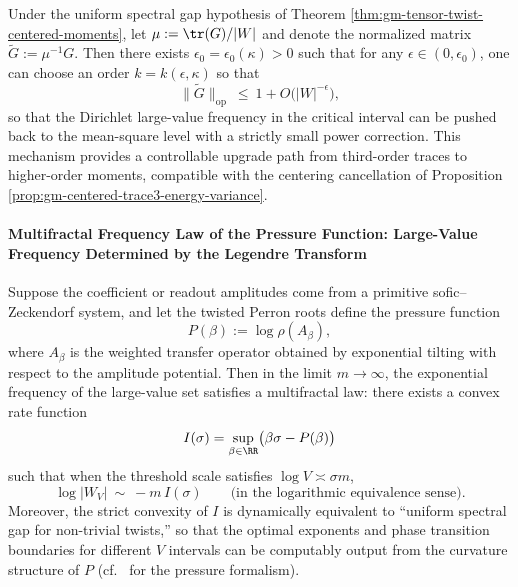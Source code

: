 \begin{corollary}\label{cor:gm-adjustable-moment-mean-square}
Under the uniform spectral gap hypothesis of Theorem \ref{thm:gm-tensor-twist-centered-moments}, let \(\mu:=\tr(G)/|W|\) and denote the normalized matrix \(\widetilde G:=\mu^{-1}G\).
Then there exists \(\epsilon_0=\epsilon_0(\kappa)>0\) such that for any \(\epsilon\in(0,\epsilon_0)\), one can choose an order \(k=k(\epsilon,\kappa)\) so that
\[
\|\widetilde G\|_{\mathrm{op}}
\ \le\
1+O\!\bigl(|W|^{-\epsilon}\bigr),
\]
so that the Dirichlet large-value frequency in the critical interval can be pushed back to the mean-square level with a strictly small power correction.
This mechanism provides a controllable upgrade path from third-order traces to higher-order moments, compatible with the centering cancellation of Proposition \ref{prop:gm-centered-trace3-energy-variance}.
\end{corollary}

\paragraph{Multifractal Frequency Law of the Pressure Function: Large-Value Frequency Determined by the Legendre Transform}
\begin{theorem}\label{thm:gm-multifractal-pressure-legendre}
Suppose the coefficient or readout amplitudes come from a primitive sofic--Zeckendorf system, and let the twisted Perron roots define the pressure function
\[
P(\beta):=\log\rho(A_\beta),
\]
where \(A_\beta\) is the weighted transfer operator obtained by exponential tilting with respect to the amplitude potential.
Then in the limit \(m\to\infty\), the exponential frequency of the large-value set satisfies a multifractal law: there exists a convex rate function
\[
I(\sigma)=\sup_{\beta\in\RR}\bigl(\beta\sigma-P(\beta)\bigr)
\]
such that when the threshold scale satisfies \(\log V\asymp \sigma m\),
\[
\log |W_V|\ \sim\ -m\,I(\sigma)
\qquad\text{(in the logarithmic equivalence sense)}.
\]
Moreover, the strict convexity of \(I\) is dynamically equivalent to ``uniform spectral gap for non-trivial twists,'' so that the optimal exponents and phase transition boundaries for different \(V\) intervals can be computably output from the curvature structure of \(P\) (cf.\ \cite{Ruelle1978Thermodynamic} for the pressure formalism).
\end{theorem}
\endinput


